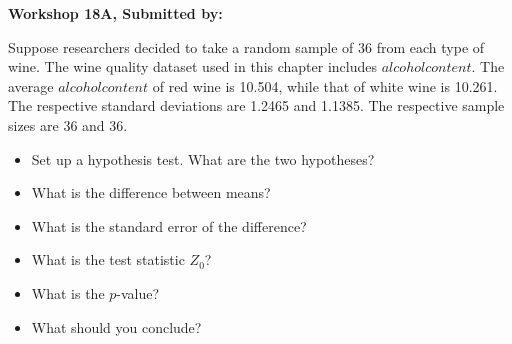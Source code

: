 \documentclass[11pt, chapterprefix=true]{scrbook}\usepackage[]{graphicx}\usepackage[]{color}
\begin{document}
\begin{exercises}
\begin{exercise}
\end{exercise}
\begin{solution}  %

\end{solution}




\clearpage

    \begin{exercise}  %
    


    \begin{center}
\begin{flushleft}\textbf{\large \hfill Workshop 18A, Submitted by: }\end{flushleft}

\end{center}

Suppose researchers decided to take a random sample of 36 from each type of wine.  The wine quality dataset used in this chapter includes $alcohol content$. The average $alcohol content$ of red wine is 10.504, while that of white wine is 10.261. The respective standard deviations are 1.2465 and 1.1385. The respective sample sizes are 36 and 36.

\begin{itemize}
  \item Set up a hypothesis test. What are the two hypotheses?
  \item What is the difference between means?
  \item What is the standard error of the difference?
  \item What is the test statistic $Z_0$?
  \item What is the $p$-value?
  \item What should you conclude?
\end{itemize}


\end{exercise}
\end{exercises}
\end{document}
